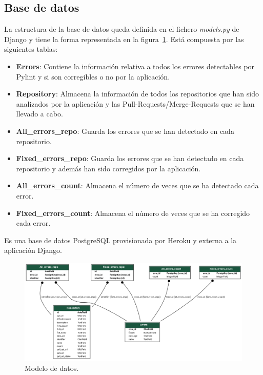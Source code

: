 \documentclass[a4paper, 12pt]{book}
\begin{document}
\subsection{Base de datos}
\label{subsec:diseño_bbdd}

La estructura de la base de datos queda definida en el fichero \textit{models.py} de Django y tiene la forma representada en la figura~\ref{fig:models}.
Está compuesta por las siguientes tablas:
\begin{itemize}
	\item \textbf{Errors}: Contiene la información relativa a todos los errores detectables por Pylint y si son corregibles o no por la aplicación.
	\item \textbf{Repository}: Almacena la información de todos los repositorios que han sido analizados por la aplicación y las Pull-Requests/Merge-Requests que se han llevado a cabo.
	\item \textbf{All\_errors\_repo}: Guarda los errores que se han detectado en cada repositorio.
	\item \textbf{Fixed\_errors\_repo}: Guarda los errores que se han detectado en cada repositorio y además han sido corregidos por la aplicación.
	\item \textbf{All\_errors\_count}:  Almacena el número de veces que se ha detectado cada error.
	\item \textbf{Fixed\_errors\_count}: Almacena el número de veces que se ha corregido cada error.
\end{itemize}

Es una base de datos PostgreSQL provisionada por Heroku y externa a la aplicación Django.

\begin{figure}
  \centering
  \includegraphics[width=16cm, keepaspectratio]{img/models.png}
  \caption{Modelo de datos.}\label{fig:models}
\end{figure}
\end{document}
